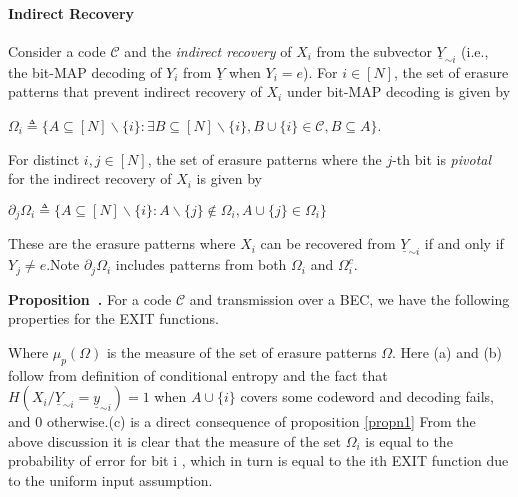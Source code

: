 \documentclass[
10pt, %
a4paper, %
oneside, %
headinclude,footinclude, %
BCOR5mm, %
]{scrartcl}
\newenvironment{proposition}[1][]{\refstepcounter{definition}\par\medskip
   \noindent \textbf{Proposition~\thedefinition. #1} \rmfamily}{\medskip}
\begin{document}
\paragraph{Indirect Recovery} Consider a code $\mathcal{C}$ and the \emph{indirect recovery} of $X_i$ from the subvector $\underline{Y}_{\sim i}$ (i.e., the bit-MAP decoding of $Y_i$ from $\underline{Y}$ when $Y_i=e$). For $i \in [N]$, the set of erasure patterns that prevent indirect recovery of $X_i$ under bit-MAP decoding is given by 
\begin{definition}
$\Omega_i \triangleq \{A \subseteq [N]\backslash\{i\} : \exists B \subseteq [N]\backslash\{i\}, B \cup \{i\} \in \mathcal{C}, B \subseteq A\}$.
\label{defn2}
\end{definition}
For distinct $i,j \in [N]$, the set of erasure patterns where the $j$-th bit is \emph{pivotal} for the indirect recovery of $X_i$ is given by 
\begin{definition}
$\partial_j\Omega_i \triangleq \{A \subseteq [N]\backslash\{i\}: A\backslash \{j\} \notin \Omega_i, A \cup \{j\} \in \Omega_i \}$
\end{definition}
These are the erasure patterns where $X_i$ can be recovered from $\underline{Y}_{\sim i}$ if and only if $Y_j \neq e$.Note $\partial_j\Omega_i$ includes patterns from both $\Omega_i$ and $\Omega_i^c$.
\begin{proposition}
\label{propn4}
For a code $\mathcal{C}$ and transmission over a BEC, we have the following properties for the EXIT functions.
Where $\mu_{p}(\Omega)$ is the measure of the set of erasure patterns $\Omega$.
Here (a) and (b) follow from definition of conditional entropy and the fact that $H(X_i/\underline{Y}_{\sim i}=\underline{y}_{\sim i})=1$ when $A \cup \{i\}$ covers some codeword and decoding fails, and $0$ otherwise.(c) is a direct consequence of proposition \ref{propn1}
\end{proposition}
From the above discussion it is clear that the measure of the set $\Omega_i$ is equal to the probability of error for bit i , which in turn is equal to the ith EXIT function due to the uniform input assumption.
\end{document}
